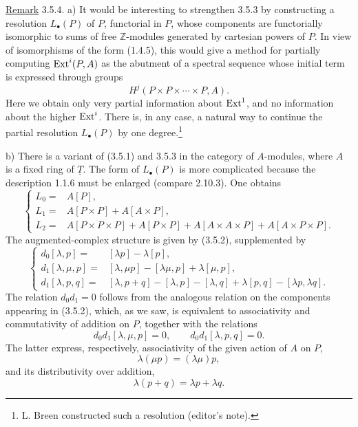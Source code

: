 \underline{Remark} 3.5.4. a) It would be interesting to strengthen
3.5.3 by constructing a resolution $L_\bullet(P)$ of $P$, functorial
in $P$, whose components are functorially isomorphic to sums of free
$\mathbb Z$-modules generated by cartesian powers of $P$.  In view
of isomorphisms of the form (1.4.5), this would give a method for
partially computing $\operatorname{Ext}^i(P,A)$ as the abutment of a spectral
sequence whose initial term is expressed through groups
\[
 H^j(P\times P\times\cdots\times P,A).
\]
Here we obtain only very partial information about $\operatorname{Ext}^1$, and no
information about the higher $\operatorname{Ext}^i$.  There is, in any case, a
natural way to continue the partial resolution $L_\bullet(P)$ by one
degree.\footnote{L. Breen constructed such a resolution (editor's
note).}

b) There is a variant of (3.5.1) and 3.5.3 in the category of
$A$-modules, where $A$ is a fixed ring of $\underline T$.  The form
of $L_\bullet(P)$ is more complicated because the description 1.1.6
must be enlarged (compare 2.10.3).  One obtains
\begin{equation}\tag{3.5.5}
\left\{
\begin{aligned}
 L_0={}&A[P],\\
 L_1={}&A[P\times P]+A[A\times P],\\
 L_2={}&A[P\times P\times P]+A[P\times P]
       +A[A\times A\times P]+A[A\times P\times P].
\end{aligned}
\right.
\end{equation}
The augmented-complex structure is given by (3.5.2), supplemented by
\begin{equation}\tag{3.5.6}
\left\{
\begin{aligned}
 d_0[\lambda,p]={}&[\lambda p]-\lambda[p],\\
 d_1[\lambda,\mu,p]={}&[\lambda,\mu p]-[\lambda\mu,p]
                         +\lambda[\mu,p],\\
 d_1[\lambda,p,q]={}&[\lambda,p+q]-[\lambda,p]-[\lambda,q]
                       +\lambda[p,q]-[\lambda p,\lambda q].
\end{aligned}
\right.
\end{equation}
The relation $d_0d_1=0$ follows from the analogous relation on the
components appearing in (3.5.2), which, as we saw, is equivalent to
associativity and commutativity of addition on $P$, together with
the relations
\[
 d_0d_1[\lambda,\mu,p]=0,
 \qquad d_0d_1[\lambda,p,q]=0.
\]
The latter express, respectively, associativity of the given action
of $A$ on $P$,
\[
 \lambda(\mu p)=(\lambda\mu)p,
\]
and its distributivity over addition,
\[
 \lambda(p+q)=\lambda p+\lambda q.
\]


